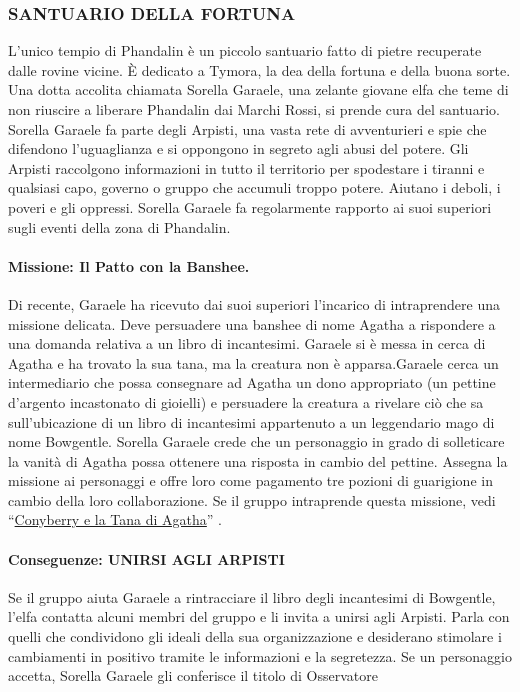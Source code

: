 \documentclass{article}
\begin{document}
\subsubsection{SANTUARIO DELLA FORTUNA}
\hypertarget{santuario}{}
L'unico tempio di Phandalin è un piccolo santuario fatto di
pietre recuperate dalle rovine vicine. È dedicato a Tymora, la
dea della fortuna e della buona sorte.
Una dotta accolita chiamata Sorella Garaele, una zelante
giovane elfa che teme di non riuscire a liberare Phandalin dai
Marchi Rossi, si prende cura del santuario. Sorella Garaele
fa parte degli Arpisti, una vasta rete di avventurieri e spie che
difendono l'uguaglianza e si oppongono in segreto agli abusi
del potere. Gli Arpisti raccolgono informazioni in tutto il
territorio per spodestare i tiranni e qualsiasi capo, governo o
gruppo che accumuli troppo potere. Aiutano i deboli, i poveri
e gli oppressi. Sorella Garaele fa regolarmente rapporto ai
suoi superiori sugli eventi della zona di Phandalin.
\paragraph{Missione: Il Patto con la Banshee.}
Di recente, Garaele
ha ricevuto dai suoi superiori l’incarico di intraprendere una
missione delicata. Deve persuadere una banshee di nome
Agatha a rispondere a una domanda relativa a un libro di
incantesimi. Garaele si è messa in cerca di Agatha e ha
trovato la sua tana, ma la creatura non è apparsa.Garaele cerca un intermediario che possa consegnare ad
Agatha un dono appropriato (un pettine d'argento incastonato
di gioielli) e persuadere la creatura a rivelare ciò che sa
sull’ubicazione di un libro di incantesimi appartenuto a un
leggendario mago di nome Bowgentle. Sorella Garaele crede
che un personaggio in grado di solleticare la vanità di Agatha
possa ottenere una risposta in cambio del pettine. Assegna
la missione ai personaggi e offre loro come pagamento tre
pozioni di guarigione in cambio della loro collaborazione. Se
il gruppo intraprende questa missione, vedi “\hyperlink{agatha}{Conyberry e la
Tana di Agatha}” .
\paragraph{Conseguenze: UNIRSI AGLI ARPISTI }
Se il gruppo aiuta Garaele a rintracciare il libro degli
incantesimi di Bowgentle, l’elfa contatta alcuni membri del
gruppo e li invita a unirsi agli Arpisti. Parla con quelli che
condividono gli ideali della sua organizzazione e desiderano
stimolare i cambiamenti in positivo tramite le informazioni e
la segretezza. Se un personaggio accetta, Sorella Garaele gli
conferisce il titolo di Osservatore
\end{document}
